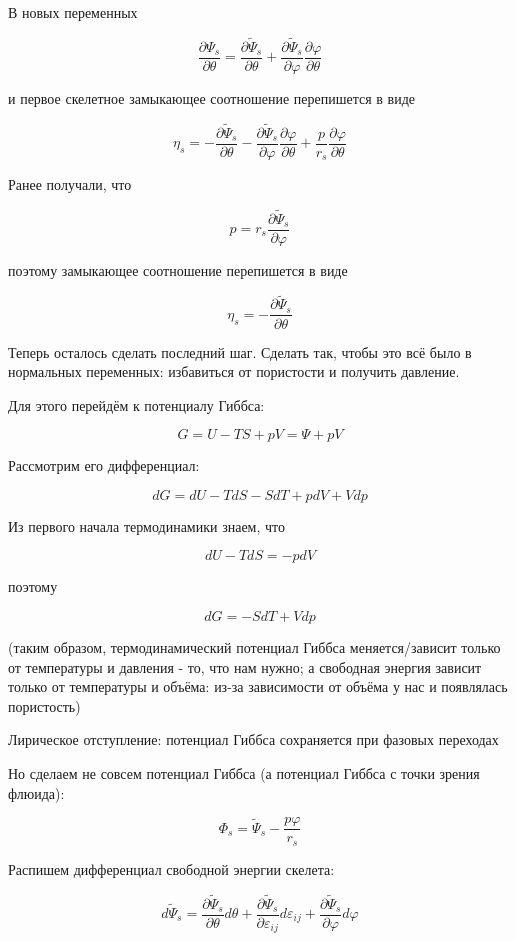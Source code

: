 \documentclass[main.tex]{subfiles}
\begin{document}
В новых переменных

$$\frac{\partial\Psi_s}{\partial\theta}=\frac{\partial\tilde{\Psi}_s}{\partial\theta}+\frac{\partial\tilde{\Psi}_s}{\partial\varphi}\frac{\partial\varphi}{\partial\theta}$$

и первое скелетное замыкающее соотношение перепишется в виде

$$\eta_s=-\frac{\partial\tilde{\Psi}_s}{\partial\theta}-\frac{\partial\tilde{\Psi}_s}{\partial\varphi}\frac{\partial\varphi}{\partial\theta}+\frac{p}{r_s}\frac{\partial\varphi}{\partial\theta}$$

Ранее получали, что 

$$p=r_s\frac{\partial\tilde{\Psi}_s}{\partial\varphi}$$

поэтому замыкающее соотношение перепишется в виде

$$\eta_s=-\frac{\partial\tilde{\Psi}_s}{\partial\theta}$$

Теперь осталось сделать последний шаг. Сделать так, чтобы это всё было в нормальных переменных: избавиться от пористости и получить давление.

Для этого перейдём к потенциалу Гиббса:

$$G=U-TS+pV=\Psi+pV$$

Рассмотрим его дифференциал:

$$dG=dU-TdS-SdT+pdV+Vdp$$

Из первого начала термодинамики знаем, что

$$dU-TdS=-pdV$$

поэтому

$$dG=-SdT+Vdp$$

(таким образом, термодинамический потенциал Гиббса меняется/зависит только от температуры и давления - то, что нам нужно; а свободная энергия зависит только от температуры и объёма: из-за зависимости от объёма у нас и появлялась пористость)

Лирическое отступление: потенциал Гиббса сохраняется при фазовых переходах

Но сделаем не совсем потенциал Гиббса (а потенциал Гиббса с точки зрения флюида):

$$\Phi_s=\tilde{\Psi}_s-\frac{p\varphi}{r_s}$$

Распишем дифференциал свободной энергии скелета:

$$d\tilde{\Psi}_s=\frac{\partial\tilde{\Psi}_s}{\partial\theta}d\theta+\frac{\partial\tilde{\Psi}_s}{\partial\varepsilon_{ij}}d\varepsilon_{ij}+\frac{\partial\tilde{\Psi}_s}{\partial\varphi}d\varphi$$
\end{document}
